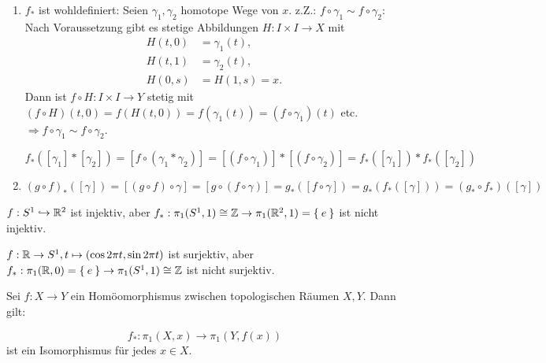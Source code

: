\begin{beweis}\leavevmode
    \begin{enumerate}[label=\alph*)]
        \item $f_*$ ist wohldefiniert: Seien $\gamma_1, \gamma_2$ homotope
              Wege von $x$. z.Z.: $f \circ \gamma_1 \sim f \circ \gamma_2$:
              Nach Voraussetzung gibt es stetige Abbildungen $H:I\times I \rightarrow X$
              mit 
              \begin{align*}
                H(t,0) &= \gamma_1(t),\\
                H(t,1) &= \gamma_2(t),\\
                H(0,s) &= H(1, s) = x\text{.}
              \end{align*}
              Dann ist $f \circ H: I \times I \rightarrow Y$ stetig mit
              $(f \circ H)(t,0) = f(H(t,0)) = f(\gamma_1(t)) = (f \circ \gamma_1)(t)$
              etc. $\Rightarrow f \circ \gamma_1 \sim f \circ \gamma_2$.

              $f_*([\gamma_1] * [\gamma_2]) = [f \circ (\gamma_1 * \gamma_2)] = [(f \circ \gamma_1)] * [(f \circ \gamma_2)] = f_*([\gamma_1]) * f_*([\gamma_2])$
        \item $(g \circ f)_* ([\gamma]) = [(g \circ f) \circ \gamma] = [g \circ (f \circ \gamma)] = g_* ([f \circ \gamma]) = g_* (f_* ([\gamma])) = (g_* \circ f_*)([\gamma])$
    \end{enumerate}
\end{beweis}

\begin{beispiel}
    \begin{bspenum}
        \item $f:S^1 \hookrightarrow \mathbb{R}^2$ ist injektiv, aber 
              $f_*:\pi_1(S^1, 1) \cong \mathbb{Z} \rightarrow \pi_1(\mathbb{R}^2, 1) = \Set{e}$
              ist nicht injektiv.
        \item $f: \mathbb{R} \rightarrow S^1, t \mapsto (\cos 2 \pi t, \sin 2 \pi t)$
              ist surjektiv, aber $f_*: \pi_1(\mathbb{R}, 0) = \Set{e} \rightarrow \pi_1(S^1, 1) \cong \mathbb{Z}$
              ist nicht surjektiv.
    \end{bspenum}
\end{beispiel}

\begin{bemerkung}%
    Sei $f:X \rightarrow Y$ ein Homöomorphismus zwischen topologischen
    Räumen $X, Y$. Dann gilt:

    \[f_*: \pi_1(X,x) \rightarrow \pi_1(Y, f(x))\]
    ist ein Isomorphismus für jedes $x \in X$.
\end{bemerkung}

